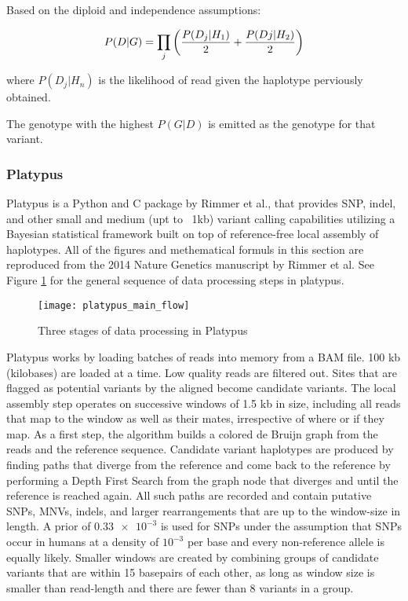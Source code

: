 Based on the diploid and independence assumptions:

\begin{equation}
    P(D|G) = \prod_j{\bigg({P(D_j|H_1)\over 2} + {P(Dj|H_2)\over 2}\bigg)}
\end{equation}

where $P(D_j|H_n)$ is the likelihood of read given the haplotype perviously obtained.

The genotype with the highest $P(G|D)$ is emitted as the genotype for that variant.

\subsubsection{Platypus}
Platypus\autocite{rimmer2014integrating} is a Python and C package by Rimmer et al., that provides SNP, indel, and other small and medium (upt to ~1kb) variant calling capabilities utilizing a Bayesian statistical framework built on top of reference-free local assembly of haplotypes. All of the figures and methematical formuls in this section are reproduced from the 2014 Nature Genetics manuscript by Rimmer et al. See Figure \ref{fig:platypus_main_flow} for the general sequence of data processing steps in platypus.

\begin{figure}[H]
    \texttt{[image: platypus\_main\_flow]}
    \centering
    \caption {Three stages of data processing in Platypus\autocite{rimmer2014integrating}}
    \label{fig:platypus_main_flow}
    \end{figure}


Platypus works by loading batches of reads into memory from a BAM file. 100 kb (kilobases) are loaded at a time. Low quality reads are filtered out. Sites that are flagged as potential variants by the aligned become candidate variants. The local assembly step operates on successive windows of 1.5 kb in size, including all reads that map to the window as well as their mates, irrespective of where or if they map. As a first step, the algorithm builds a colored de Bruijn graph\autocite{iqbal2012novo} from the reads and the reference sequence. Candidate variant haplotypes are produced by finding paths that diverge from the reference and come back to the reference by performing a Depth First Search from the graph node that diverges and until the reference is reached again. All such paths are recorded and contain putative SNPs, MNVs, indels, and larger rearrangements that are up to the window-size in length. A prior of $\num{0.33e-3}$ is used for SNPs under the assumption that SNPs occur in humans at a density of $10^{-3}$ per base and every non-reference allele is equally likely. Smaller windows are created by combining groups of candidate variants that are within 15 basepairs of each other, as long as window size is smaller than read-length and there are fewer than 8 variants in a group.

